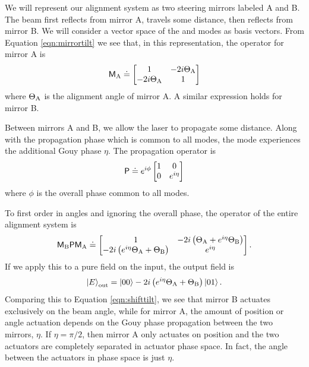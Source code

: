 We will represent our alignment system as two steering mirrors labeled A and B. %
The beam first reflects from mirror A, travels some distance, then reflects from mirror B. %
We will consider a vector space of the  and  modes as basis vectors. %
From Equation \ref{eqn:mirrortilt} we see that, in this representation, the operator for mirror A is
\begin{equation}
\mathsf{M}_{\rm A} \doteq \left[\begin{matrix} 1 &-2i\Theta_{\rm A}\\-2i\Theta_{\rm A} & 1\end{matrix}\right]
\end{equation}
where $\Theta_{\rm A}$ is the alignment angle of mirror A. %
A similar expression holds for mirror B.

Between mirrors A and B, we allow the laser to propagate some distance. %
Along with the propagation phase which is common to all modes, the  mode experiences the additional Gouy phase $\eta$. %
The propagation operator is
\begin{equation}
\mathsf{P}\doteq e^{i\phi}\left[\begin{matrix} 1&0\\0&e^{i\eta}\end{matrix}\right]
\end{equation}
where $\phi$ is the overall phase common to all modes.

To first order in angles and ignoring the overall phase, the operator of the entire alignment system is
\begin{equation}
\mathsf{M}_{\rm B}\mathsf{P}\mathsf{M}_{\rm A}\doteq
\left[\begin{matrix} 1 & -2i\left(\Theta_{\rm A}+e^{i\eta}\Theta_{\rm B}\right)\\
-2i\left(e^{i\eta}\Theta_{\rm A}+\Theta_{\rm B}\right) & e^{i\eta} \end{matrix}\right].
\end{equation}
If we apply this to a pure  field on the input, the output field is
\begin{equation}
\left| E \right>_{\rm{out}}=\left| 00 \right>-2i\left(e^{i\eta}\Theta_{\rm A}+\Theta_{\rm B}\right)\left| 01 \right>.
\end{equation}
Comparing this to Equation \ref{eqn:shifttilt}, we see that mirror B actuates exclusively on the beam angle, while for mirror A, the amount of position or angle actuation depends on the Gouy phase propagation between the two mirrors, $\eta$. %
If $\eta=\pi/2$, then mirror A only actuates on position and the two actuators are completely separated in actuator phase space. %
In fact, the angle between the actuators in phase space is just $\eta$.

